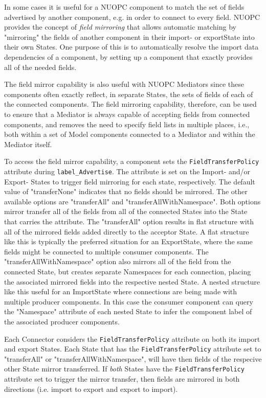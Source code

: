 %

\label{FieldMirror}

In some cases it is useful for a NUOPC component to match the set of fields advertised by another component, e.g. in order to connect to every field. NUOPC provides the concept of {\em field mirroring} that allows automatic matching by "mirroring" the fields of another component in their import- or exportState into their own States. One purpose of this is to automatically resolve the import data dependencies of a component, by setting up a component that exactly provides all of the needed fields.

The field mirror capability is also useful with NUOPC Mediators since these components often exactly reflect, in separate States, the sets of fields of each of the connected components.  The field mirroring capability, therefore, can be used to ensure that a Mediator is always capable of accepting fields from connected components, and removes the need to specify field lists in multiple places, i.e., both within a set of Model components connected to a Mediator and within the Mediator itself.

To access the field mirror capability, a component sets the {\tt FieldTransferPolicy} attribute during {\tt label\_Advertise}. The attribute is set on the Import- and/or Export- States to trigger field mirroring for each state, respectively.  The default value of "transferNone" indicates that no fields should be mirrored.  The other available options are "transferAll" and "transferAllWithNamespace". Both options mirror transfer all of the fields from all of the connected States into the State that carries the attribute. The "transferAll" option results in flat structure with all of the mirrored fields added directly to the acceptor State. A flat structure like this is typically the preferred situation for an ExportState, where the same fields might be connected to multiple consumer components. The "transferAllWithNamespace" option also mirrors all of the field from the connected State, but creates separate Namespaces for each connection, placing the associated mirrored fields into the respective nested State. A nested structure like this useful for an ImportState where connections are being made with multiple producer components. In this case the consumer component can query the "Namespace" attribute of each nested State to infer the component label of the associated producer components.

Each Connector considers the {\tt FieldTransferPolicy} attribute on both its import and export States.  Each State that has the {\tt FieldTransferPolicy} attribute set to "transferAll" or "transferAllWithNamespace", will have then fields of the respecive other State mirror transferred. If {\em both} States have the {\tt FieldTransferPolicy} attribute set to trigger the mirror transfer, then fields are mirrored in both directions (i.e. import to export and export to import).


